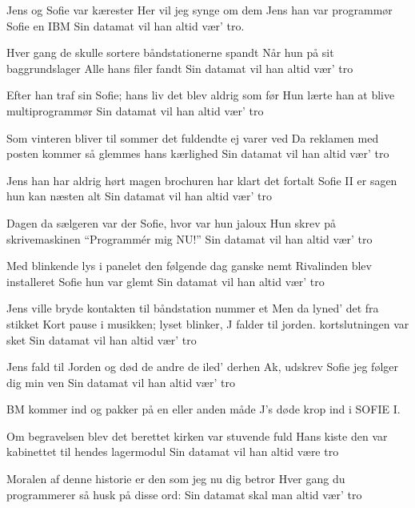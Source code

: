 \documentclass[a4paper,11pt]{article}
\begin{document}
\begin{song}
Jens og Sofie var kærester
Her vil jeg synge om dem
Jens han var programmør
Sofie en IBM
Sin datamat
vil han altid vær' tro.

Hver gang de skulle sortere
båndstationerne spandt
Når hun på sit baggrundslager
Alle hans filer fandt
Sin datamat
vil han altid vær' tro

Efter han traf sin Sofie;
hans liv det blev aldrig som før
Hun lærte han at blive
multiprogrammør
Sin datamat
vil han altid vær' tro

Som vinteren bliver til sommer
det fuldendte ej varer ved
Da reklamen med posten kommer
så glemmes hans kærlighed
Sin datamat
vil han altid vær' tro

Jens han har aldrig hørt magen
brochuren har klart det fortalt
Sofie II er sagen
hun kan næsten alt
Sin datamat
vil han altid vær' tro

Dagen da sælgeren var der
Sofie, hvor var hun jaloux
Hun skrev på skrivemaskinen
"`Programmér mig NU!"'
Sin datamat
vil han altid vær' tro

Med blinkende lys i panelet
den følgende dag ganske nemt
Rivalinden blev installeret
Sofie hun var glemt
Sin datamat
vil han altid vær' tro

Jens ville bryde kontakten
til båndstation nummer et
Men da lyned' det fra stikket
{\scene Kort pause i musikken; lyset blinker, J falder til jorden.}
kortslutningen var sket
Sin datamat
vil han altid vær' tro

Jens fald til Jorden og død
de andre de iled' derhen
Ak, udskrev Sofie
jeg følger dig min ven
Sin datamat
vil han altid vær' tro

{\scene BM kommer ind og pakker på en eller anden måde J's døde krop ind i SOFIE I.}

Om begravelsen blev det berettet
kirken var stuvende fuld
Hans kiste den var kabinettet
til hendes lagermodul
Sin datamat
vil han altid være tro

Moralen af denne historie
er den som jeg nu dig betror
Hver gang du programmerer
så husk på disse ord:
Sin datamat
skal man altid vær' tro
\end{song}
\end{document}
